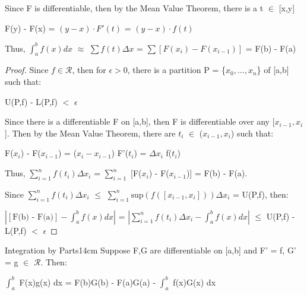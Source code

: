     \begin{intuition}
        Since F is differentiable, then by the Mean Value Theorem,
        there is a t $\in$ [x,y]

        \hspace{0.5cm}
        F(y) - F(x)
        = $(y-x) \cdot F'(t)$
        = $(y-x) \cdot f(t)$

        Thus, $\int_a^b f(x) dx$
        $\approx$ $\sum f(t) \Delta x$
        = $\sum [F(x_i) - F(x_{i-1})]$
        = F(b) - F(a)
    \end{intuition}

    \vspace{0.1cm}

    \begin{proof}
        Since $f \in \mathscr{R}$, then for $\epsilon > 0$, there is a 
        partition P = \{$x_0,...,x_n$\} of [a,b] such that:

        \hspace{0.5cm}
        U(P,f) - L(P,f) $<$ $\epsilon$

        Since there is a differentiable F on [a,b], then F is differentiable over
        any [$x_{i-1},x_i$].
        Then by the Mean Value Theorem, there are $t_i$ $\in$ ($x_{i-1},x_i$)
        such that:

        \hspace{0.5cm}
        F($x_i$) - F($x_{i-1}$)
        = ($x_i - x_{i-1}$) F'($t_i$)
        = $\Delta x_i$ f($t_i$)

        Thus,
        $\sum_{i=1}^n f(t_i) \Delta x_i$
        = $\sum_{i=1}^n$ [F($x_i$) - F($x_{i-1}$)]
        = F(b) - F(a).

        Since $\sum_{i=1}^n f(t_i) \Delta x_i$
        $\leq$ $\sum_{i=1}^n \text{sup}(f([x_{i-1},x_i])) \Delta x_i$
        = U(P,f), then:

        \hspace{0.5cm}
        $| [\text{F(b) - F(a)}] - \int_a^b f(x) dx |$
        = $|\sum_{i=1}^n f(t_i) \Delta x_i - \int_a^b f(x) dx|$
        $\leq$ U(P,f) - L(P,f) $<$ $\epsilon$        
    \end{proof}

    \vspace{0.5cm}



    \begin{wtheorem}{Integration by Parts}{14cm}
        Suppose F,G are differentiable on [a,b] and
        F' = f, G' = g $\in$ $\mathscr{R}$. Then:

        \hspace{0.5cm}
        $\int_a^b$ F(x)g(x) dx
        = F(b)G(b) - F(a)G(a) - $\int_a^b$ f(x)G(x) dx        
    \end{wtheorem}

